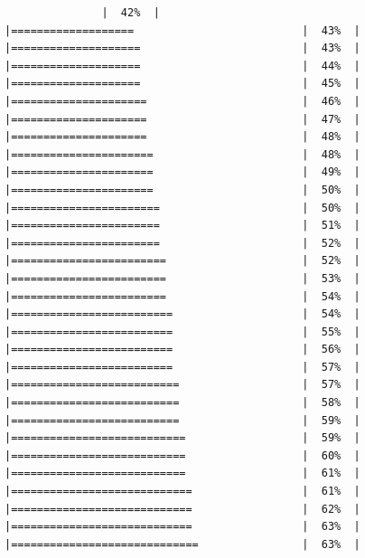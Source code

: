 \documentclass[
  krantz2]{krantz}
\begin{document}
\begin{verbatim}
               |  42%  |                                                     |===================                          |  43%  |                                                     |====================                         |  43%  |                                                     |====================                         |  44%  |                                                     |====================                         |  45%  |                                                     |=====================                        |  46%  |                                                     |=====================                        |  47%  |                                                     |=====================                        |  48%  |                                                     |======================                       |  48%  |                                                     |======================                       |  49%  |                                                     |======================                       |  50%  |                                                     |=======================                      |  50%  |                                                     |=======================                      |  51%  |                                                     |=======================                      |  52%  |                                                     |========================                     |  52%  |                                                     |========================                     |  53%  |                                                     |========================                     |  54%  |                                                     |=========================                    |  54%  |                                                     |=========================                    |  55%  |                                                     |=========================                    |  56%  |                                                     |=========================                    |  57%  |                                                     |==========================                   |  57%  |                                                     |==========================                   |  58%  |                                                     |==========================                   |  59%  |                                                     |===========================                  |  59%  |                                                     |===========================                  |  60%  |                                                     |===========================                  |  61%  |                                                     |============================                 |  61%  |                                                     |============================                 |  62%  |                                                     |============================                 |  63%  |                                                     |=============================                |  63%  |                                                     
\end{verbatim}
\end{document}
